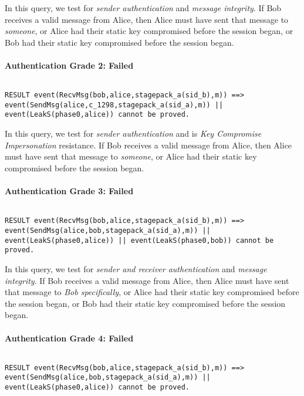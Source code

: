 In this query, we test for \emph{sender authentication} and \emph{message integrity}. If Bob receives a valid message from Alice, then Alice must have sent that message to \emph{someone}, or Alice had their static key compromised before the session began, or Bob had their static key compromised before the session began.


\paragraph{Authentication Grade 2: Failed}$ $
\begin{lstlisting}
RESULT event(RecvMsg(bob,alice,stagepack_a(sid_b),m)) ==> event(SendMsg(alice,c_1298,stagepack_a(sid_a),m)) || event(LeakS(phase0,alice)) cannot be proved.
\end{lstlisting}

In this query, we test for \emph{sender authentication} and is \emph{Key Compromise Impersonation} resistance. If Bob receives a valid message from Alice, then Alice must have sent that message to \emph{someone}, or Alice had their static key compromised before the session began.


\paragraph{Authentication Grade 3: Failed}$ $
\begin{lstlisting}
RESULT event(RecvMsg(bob,alice,stagepack_a(sid_b),m)) ==> event(SendMsg(alice,bob,stagepack_a(sid_a),m)) || event(LeakS(phase0,alice)) || event(LeakS(phase0,bob)) cannot be proved.
\end{lstlisting}

In this query, we test for \emph{sender and receiver authentication} and \emph{message integrity}. If Bob receives a valid message from Alice, then Alice must have sent that message to \emph{Bob specifically}, or Alice had their static key compromised before the session began, or Bob had their static key compromised before the session began.


\paragraph{Authentication Grade 4: Failed}$ $
\begin{lstlisting}
RESULT event(RecvMsg(bob,alice,stagepack_a(sid_b),m)) ==> event(SendMsg(alice,bob,stagepack_a(sid_a),m)) || event(LeakS(phase0,alice)) cannot be proved.
\end{lstlisting}

